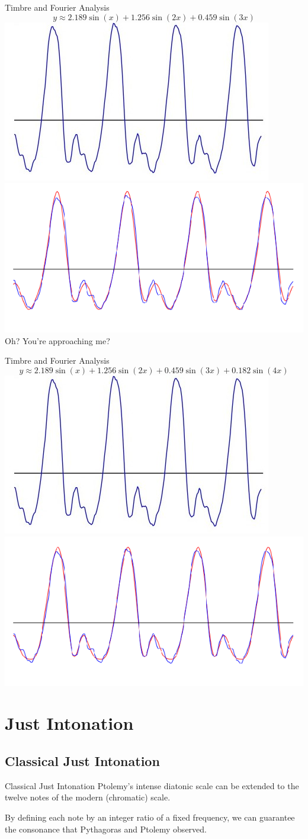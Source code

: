 \documentclass{beamer}
\begin{document}
\begin{frame}{Timbre and Fourier Analysis}
    $$y \approx  2.189\sin(x) + 1.256\sin(2x) + 0.459\sin(3x)$$
    \includegraphics[width=.49\textwidth]{violin_waveform.jpg}
    \includegraphics[width=.49\textwidth]{Violin_Fourier_Frames/frame_3_delay-1s.png}
    \tiny{Oh? You're approaching me?}
\end{frame}

\begin{frame}{Timbre and Fourier Analysis}
    $$y \approx  2.189\sin(x) + 1.256\sin(2x) + 0.459\sin(3x) + 0.182\sin(4x)$$
    \includegraphics[width=.49\textwidth]{violin_waveform.jpg}
    \includegraphics[width=.49\textwidth]{Violin_Fourier_Frames/frame_4_delay-1s.png}
\end{frame}

\section{Just Intonation}
\subsection{Classical Just Intonation}
\begin{frame}{Classical Just Intonation}
    \pause Ptolemy's intense diatonic scale can be extended to the  twelve notes of the modern (chromatic) scale.
    
    \pause By defining each note by an integer ratio of a fixed frequency, we can guarantee the consonance that Pythagoras and Ptolemy observed.
\end{frame}
\end{document}
